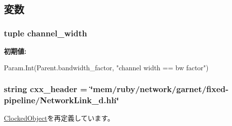 \subsection{変数}
\hypertarget{classGarnetLink__d_1_1NetworkLink__d_a1129edba1db6bd1f0c3d1ddda4be3d9d}{
\subsubsection[{channel\_\-width}]{\setlength{\rightskip}{0pt plus 5cm}tuple {\bf channel\_\-width}}}
\label{classGarnetLink__d_1_1NetworkLink__d_a1129edba1db6bd1f0c3d1ddda4be3d9d}
{\bfseries 初期値:}
\begin{DoxyCode}
Param.Int(Parent.bandwidth_factor,
                              "channel width == bw factor")
\end{DoxyCode}
\hypertarget{classGarnetLink__d_1_1NetworkLink__d_a17da7064bc5c518791f0c891eff05fda}{
\subsubsection[{cxx\_\-header}]{\setlength{\rightskip}{0pt plus 5cm}string {\bf cxx\_\-header} = \char`\"{}mem/ruby/network/garnet/fixed-\/pipeline/NetworkLink\_\-d.hh\char`\"{}}}
\label{classGarnetLink__d_1_1NetworkLink__d_a17da7064bc5c518791f0c891eff05fda}


\hyperlink{classClockedObject_1_1ClockedObject_a17da7064bc5c518791f0c891eff05fda}{ClockedObject}を再定義しています。

